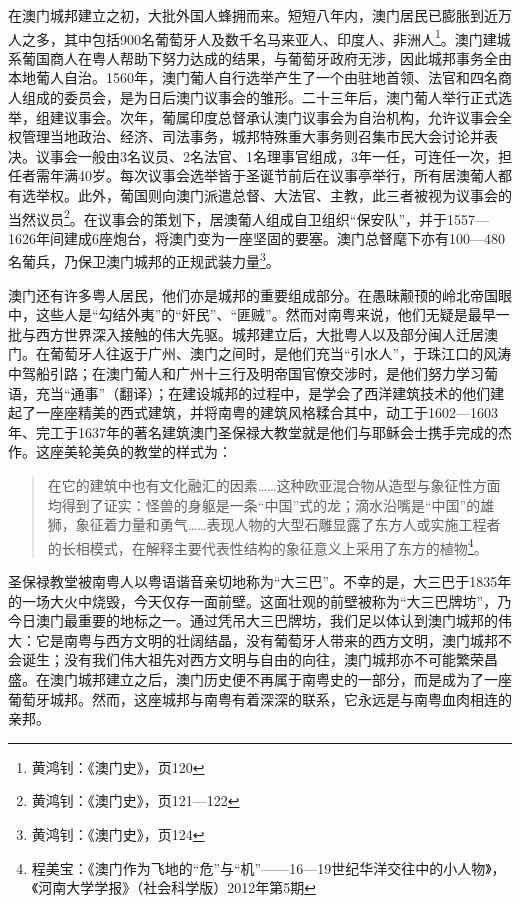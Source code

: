在澳门城邦建立之初，大批外国人蜂拥而来。短短八年内，澳门居民已膨胀到近万人之多，其中包括900名葡萄牙人及数千名马来亚人、印度人、非洲人\footnote{黄鸿钊：《澳门史》，页120}。澳门建城系葡国商人在粤人帮助下努力达成的结果，与葡萄牙政府无涉，因此城邦事务全由本地葡人自治。1560年，澳门葡人自行选举产生了一个由驻地首领、法官和四名商人组成的委员会，是为日后澳门议事会的雏形。二十三年后，澳门葡人举行正式选举，组建议事会。次年，葡属印度总督承认澳门议事会为自治机构，允许议事会全权管理当地政治、经济、司法事务，城邦特殊重大事务则召集市民大会讨论并表决。议事会一般由3名议员、2名法官、1名理事官组成，3年一任，可连任一次，担任者需年满40岁。每次议事会选举皆于圣诞节前后在议事亭举行，所有居澳葡人都有选举权。此外，葡国则向澳门派遣总督、大法官、主教，此三者被视为议事会的当然议员\footnote{黄鸿钊：《澳门史》，页121—122}。在议事会的策划下，居澳葡人组成自卫组织“保安队”，并于1557—1626年间建成6座炮台，将澳门变为一座坚固的要塞。澳门总督麾下亦有100—480名葡兵，乃保卫澳门城邦的正规武装力量\footnote{黄鸿钊：《澳门史》，页124}。

澳门还有许多粤人居民，他们亦是城邦的重要组成部分。在愚昧颟顸的岭北帝国眼中，这些人是“勾结外夷”的“奸民”、“匪贼”。然而对南粤来说，他们无疑是最早一批与西方世界深入接触的伟大先驱。城邦建立后，大批粤人以及部分闽人迁居澳门。在葡萄牙人往返于广州、澳门之间时，是他们充当“引水人”，于珠江口的风涛中驾船引路；在澳门葡人和广州十三行及明帝国官僚交涉时，是他们努力学习葡语，充当“通事”（翻译）；在建设城邦的过程中，是学会了西洋建筑技术的他们建起了一座座精美的西式建筑，并将南粤的建筑风格糅合其中，动工于1602—1603年、完工于1637年的著名建筑澳门圣保禄大教堂就是他们与耶稣会士携手完成的杰作。这座美轮美奂的教堂的样式为：

\begin{quote}

在它的建筑中也有文化融汇的因素……这种欧亚混合物从造型与象征性方面均得到了证实：怪兽的身躯是一条“中国”式的龙；滴水沿嘴是“中国”的雄狮，象征着力量和勇气……表现人物的大型石雕显露了东方人或实施工程者的长相模式，在解释主要代表性结构的象征意义上采用了东方的植物\footnote{程美宝：《澳门作为飞地的“危”与“机”——16—19世纪华洋交往中的小人物》，《河南大学学报》（社会科学版）2012年第5期}。

\end{quote}

圣保禄教堂被南粤人以粤语谐音亲切地称为“大三巴”。不幸的是，大三巴于1835年的一场大火中烧毁，今天仅存一面前壁。这面壮观的前壁被称为“大三巴牌坊”，乃今日澳门最重要的地标之一。通过凭吊大三巴牌坊，我们足以体认到澳门城邦的伟大：它是南粤与西方文明的壮阔结晶，没有葡萄牙人带来的西方文明，澳门城邦不会诞生；没有我们伟大祖先对西方文明与自由的向往，澳门城邦亦不可能繁荣昌盛。在澳门城邦建立之后，澳门历史便不再属于南粤史的一部分，而是成为了一座葡萄牙城邦。然而，这座城邦与南粤有着深深的联系，它永远是与南粤血肉相连的亲邦。

